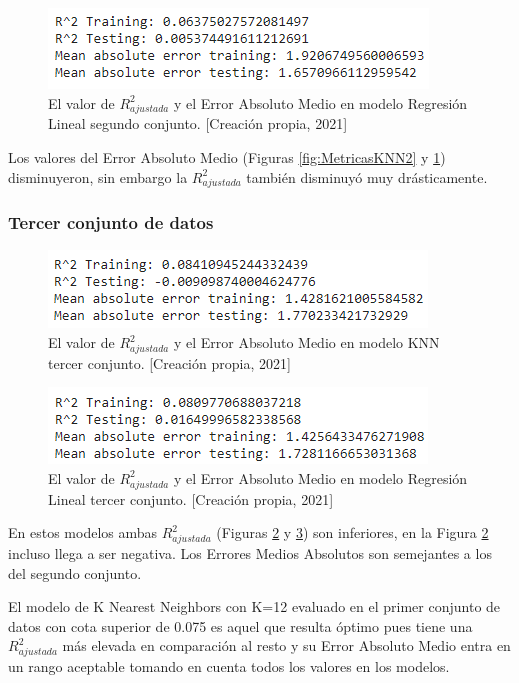 \documentclass{article}
\begin{document}
\begin{figure}[!h]
    \centering
    \includegraphics[scale=.7]{F4/F4-im35.PNG}
    \caption{El valor de $R^{2}_{ajustada}$ y el Error Absoluto Medio en modelo Regresión Lineal segundo conjunto. [Creación propia, 2021]}
    \label{fig:MetricasMAE2}
\end{figure}
Los valores del Error Absoluto Medio (Figuras   \ref{fig:MetricasKNN2} y \ref{fig:MetricasMAE2}) disminuyeron, sin embargo la $R^{2}_{ajustada}$ también disminuyó  muy drásticamente. 
\subsubsection{Tercer conjunto de datos}
\begin{figure}[!h]
    \centering
    \includegraphics[scale=.7]{F4/F4-im36.PNG}
    \caption{El valor de $R^{2}_{ajustada}$ y el Error Absoluto Medio en modelo KNN tercer conjunto. [Creación propia, 2021]}
    \label{fig:MetricasKNN3}
\end{figure}

\begin{figure}[!h]
    \centering
    \includegraphics[scale=.7]{F4/F4-im37.PNG}
    \caption{El valor de $R^{2}_{ajustada}$ y el Error Absoluto Medio en modelo Regresión Lineal tercer conjunto. [Creación propia, 2021]}
    \label{fig:MetricasMAE3}
\end{figure}

En estos modelos ambas $R^{2}_{ajustada}$ (Figuras  \ref{fig:MetricasKNN3} y \ref{fig:MetricasMAE3}) son inferiores, en la Figura \ref{fig:MetricasKNN3}
incluso llega a ser negativa. Los Errores Medios Absolutos son semejantes a los del segundo conjunto. 

El modelo de K Nearest Neighbors con K=12 evaluado en el primer conjunto de datos con cota superior de 0.075 es aquel que resulta óptimo pues tiene una $R^{2}_{ajustada}$ más elevada en comparación al resto y su Error Absoluto Medio entra en un rango aceptable tomando en cuenta todos los valores en los modelos. 
\end{document}
